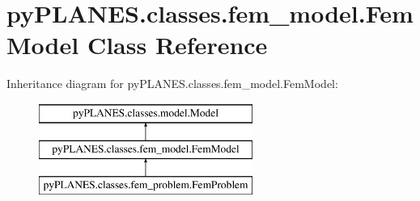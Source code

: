 \hypertarget{classpy_p_l_a_n_e_s_1_1classes_1_1fem__model_1_1_fem_model}{}\section{py\+P\+L\+A\+N\+E\+S.\+classes.\+fem\+\_\+model.\+Fem\+Model Class Reference}
\label{classpy_p_l_a_n_e_s_1_1classes_1_1fem__model_1_1_fem_model}
Inheritance diagram for py\+P\+L\+A\+N\+E\+S.\+classes.\+fem\+\_\+model.\+Fem\+Model\+:\begin{figure}[H]
\begin{center}
\leavevmode
\includegraphics[height=3.000000cm]{classpy_p_l_a_n_e_s_1_1classes_1_1fem__model_1_1_fem_model}
\end{center}
\end{figure}
